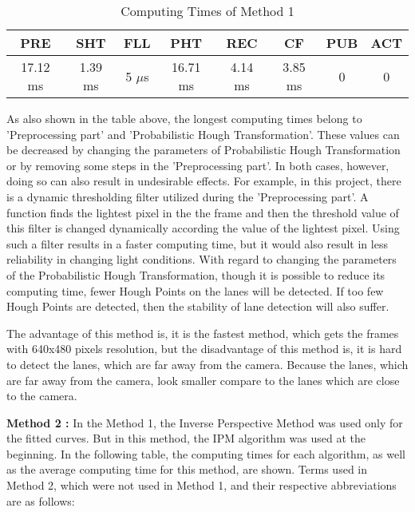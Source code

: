 \begin{table}[ht]
\caption{Computing Times of Method 1} 
\centering 
  \begin{tabular}{ | c | c | c | c | c | c | c | c |}
    \hline
  
  PRE & SHT & FLL & PHT & REC & CF & PUB & ACT \\ \hline  
  17.12 ms & 1.39 ms & 5 $\mu$s & 16.71 ms & 4.14 ms & 3.85 ms & 0 & 0 \\ \hline  
    
    
      \end{tabular}
      \label{tab:Case1_Times}
      \end{table}


As also shown in the table above, the longest computing times belong to 'Preprocessing part' and 'Probabilistic Hough Transformation'. These values can be decreased by changing the parameters of Probabilistic Hough Transformation or by removing some steps in the 'Preprocessing part'. In both cases, however, doing so can also result in undesirable effects. For example, in this project, there is a dynamic thresholding filter utilized during the 'Preprocessing part'. A function finds the lightest pixel in the the frame and then the threshold value of this filter is changed dynamically according the value of the lightest pixel. Using such a filter results in a faster computing time, but it would also result in less reliability in changing light conditions. With regard to changing the parameters of the Probabilistic Hough Transformation, though it is possible to reduce its computing time, fewer Hough Points on the lanes will be detected. If too few Hough Points are detected, then the stability of lane detection will also suffer.

The advantage of this method is, it is the fastest method, which gets the frames with 640x480 pixels resolution, but the disadvantage of this method is, it is hard to detect the lanes, which are far away from the camera. Because the lanes, which are far away from the camera, look smaller compare to the lanes which are close to the camera.




\textbf{Method 2 : }In the Method 1, the Inverse Perspective Method was used only for the fitted curves.
But in this method, the IPM algorithm was used at the beginning. In the following table, the computing times for each algorithm, as well as the average computing time for this method, are shown. Terms used in Method 2, which were not used in Method 1, and their respective abbreviations are as follows:


